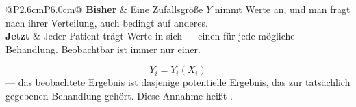 \begin{merksatz}
\begin{center}
{\small
\renewcommand{\arraystretch}{1.55}
\begin{tabular}{@{}P{2.6cm}P{6.0cm}@{}}
\toprule
\textbf{Bisher} & Eine Zufallsgröße $Y$ nimmt Werte an, und man fragt nach ihrer Verteilung, auch bedingt auf anderes.\\
\textbf{Jetzt} & Jeder Patient trägt  Werte in sich --- einen für jede mögliche Behandlung. Beobachtbar ist immer nur einer.\\
\bottomrule
\end{tabular}}
\end{center}

\[ Y_i = Y_i(X_i) \]
--- das beobachtete Ergebnis ist dasjenige potentielle Ergebnis, das zur tatsächlich gegebenen Behandlung gehört. Diese Annahme heißt .

\begin{center}
\begin{minipage}{0.88\textwidth}
\end{minipage}
\end{center}
\end{merksatz}

